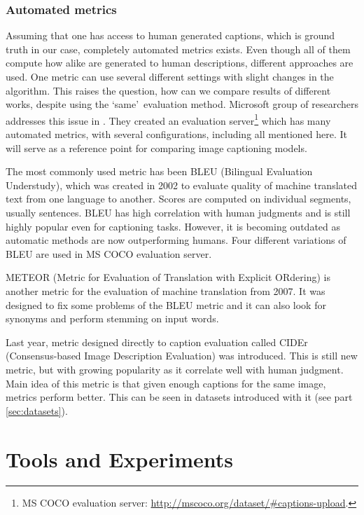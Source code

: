 		\subsection{Automated metrics}
		
Assuming that one has access to human generated captions, which is ground truth in our case, completely automated metrics exists. Even though all of them compute how alike are generated to human descriptions, different approaches are used. One metric can use several different settings with slight changes in the algorithm. This raises the question, how can we compare results of different works, despite using the \textquoteleft same\textquoteright \ evaluation method. Microsoft group of researchers addresses this issue in \cite{DBLP:journals/corr/ChenFLVGDZ15}. They created an evaluation server\footnote{MS COCO evaluation server: \url{http://mscoco.org/dataset/\#captions-upload}.} which has many automated metrics, with several configurations, including all mentioned here. It will serve as a reference point for comparing image captioning models.
		
The most commonly used metric has been BLEU (Bilingual Evaluation Understudy)\cite{Papineni:2002:BMA:1073083.1073135}, which was created in 2002 to evaluate quality of machine translated text from one language to another. Scores are computed on individual segments, usually sentences. BLEU has high correlation with human judgments and is still highly popular even for captioning tasks. However, it is becoming outdated as automatic methods are now outperforming humans. Four different variations of BLEU are used in MS COCO evaluation server.

METEOR (Metric for Evaluation of Translation with Explicit ORdering)\cite{Lavie:2007:MAM:1626355.1626389} is another metric for the evaluation of machine translation from 2007. It was designed to fix some problems of the BLEU metric and it can also look for synonyms and perform stemming on input words.
		
Last year, metric designed directly to caption evaluation called CIDEr (Consensus-based Image Description Evaluation)\cite{Vedantam_2015_CVPR} was introduced. This is still new metric, but with growing popularity as it correlate well with human judgment. Main idea of this metric is that given enough captions for the same image, metrics perform better. This can be seen in datasets introduced with it (see part \ref{sec:datasets}).		

\chapter{Tools and Experiments}\label{chp:exper}

